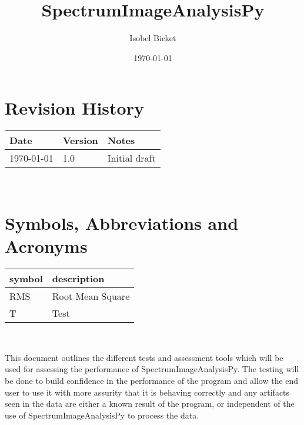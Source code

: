 \documentclass[12pt, titlepage]{article}
\newcommand{\progname}{SpectrumImageAnalysisPy}
\begin{document}

\title{SpectrumImageAnalysisPy} 
\author{Isobel Bicket}
\date{\today}
	
\maketitle


\section{Revision History}

\begin{tabularx}{\textwidth}{p{4cm}p{2cm}X}
\toprule {\bf Date} & {\bf Version} & {\bf Notes}\\
\midrule
\today & 1.0 & Initial draft\\
\bottomrule
\end{tabularx}

~\newpage

\section{Symbols, Abbreviations and Acronyms}

\renewcommand{\arraystretch}{1.2}
\begin{tabular}{l l} 
  \toprule		
  \textbf{symbol} & \textbf{description}\\
  \midrule 
  RMS & Root Mean Square\\
  T & Test\\
  \bottomrule
\end{tabular}\\


\newpage

\tableofcontents

\listoftables

\listoffigures

\newpage


This document outlines the different tests and assessment tools which will be used for assessing the performance of \progname{}. The testing will be done to build confidence in the performance of the program and allow the end user to use it with more assurity that it is behaving correctly and any artifacts seen in the data are either a known result of the program, or independent of the use of \progname{} to process the data.
\end{document}
